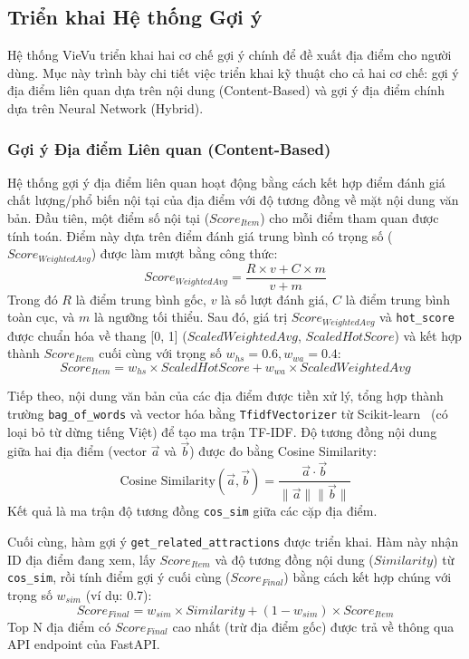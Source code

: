 \subsection{Triển khai Hệ thống Gợi ý}
\label{subsec:recsys_implementation_paragraph} %

Hệ thống VieVu triển khai hai cơ chế gợi ý chính để đề xuất địa điểm cho người dùng. Mục này trình bày chi tiết việc triển khai kỹ thuật cho cả hai cơ chế: gợi ý địa điểm liên quan dựa trên nội dung (Content-Based) và gợi ý địa điểm chính dựa trên Neural Network (Hybrid).

\subsubsection{Gợi ý Địa điểm Liên quan (Content-Based)}
\label{subsubsec:cb_recsys_impl_paragraph_final} %

Hệ thống gợi ý địa điểm liên quan hoạt động bằng cách kết hợp điểm đánh giá chất lượng/phổ biến nội tại của địa điểm với độ tương đồng về mặt nội dung văn bản. Đầu tiên, một điểm số nội tại ($Score_{Item}$) cho mỗi điểm tham quan được tính toán. Điểm này dựa trên điểm đánh giá trung bình có trọng số ($Score_{WeightedAvg}$) được làm mượt bằng công thức:
$$Score_{WeightedAvg} = \frac{R \times v + C \times m}{v + m}$$
Trong đó $R$ là điểm trung bình gốc, $v$ là số lượt đánh giá, $C$ là điểm trung bình toàn cục, và $m$ là ngưỡng tối thiểu. Sau đó, giá trị $Score_{WeightedAvg}$ và \texttt{hot\_score} được chuẩn hóa về thang [0, 1] ($ScaledWeightedAvg$, $ScaledHotScore$) và kết hợp thành $Score_{Item}$ cuối cùng với trọng số $w_{hs}=0.6, w_{wa}=0.4$:
$$Score_{Item} = w_{hs} \times ScaledHotScore + w_{wa} \times ScaledWeightedAvg$$

Tiếp theo, nội dung văn bản của các địa điểm được tiền xử lý, tổng hợp thành trường \texttt{bag\_of\_words} và vector hóa bằng \texttt{TfidfVectorizer} từ Scikit-learn~\cite{sklearn_lib} (có loại bỏ từ dừng tiếng Việt) để tạo ma trận TF-IDF. Độ tương đồng nội dung giữa hai địa điểm (vector $\vec{a}$ và $\vec{b}$) được đo bằng Cosine Similarity:
$$\text{Cosine Similarity}(\vec{a}, \vec{b}) = \frac{\vec{a} \cdot \vec{b}}{\|\vec{a}\| \|\vec{b}\|}$$
Kết quả là ma trận độ tương đồng \texttt{cos\_sim} giữa các cặp địa điểm. %

Cuối cùng, hàm gợi ý \texttt{get\_related\_attractions} được triển khai. Hàm này nhận ID địa điểm đang xem, lấy $Score_{Item}$ và độ tương đồng nội dung ($Similarity$) từ \texttt{cos\_sim}, rồi tính điểm gợi ý cuối cùng ($Score_{Final}$) bằng cách kết hợp chúng với trọng số $w_{sim}$ (ví dụ: 0.7):
$$Score_{Final} = w_{sim} \times Similarity + (1 - w_{sim}) \times Score_{Item}$$
Top N địa điểm có $Score_{Final}$ cao nhất (trừ địa điểm gốc) được trả về thông qua API endpoint của FastAPI. %

